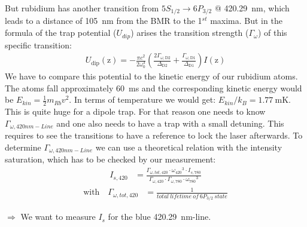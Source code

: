 But rubidium has another transition from \(5S_{1/2} \rightarrow 6P_{3/2}\) @
\SI{420.29}{\nano\meter}, which leads to a distance of \SI{105}{\nano\meter} from
the BMR to the 1\(^{st}\) maxima. But in the formula \citep{grimm} of the trap potential (\(U_{dip}\))
arises the transition strength (\(\Gamma_\omega \)) of this specific transition:
\bigskip
\begin{align}
    U_\mathrm{dip}(\mathrm{z})=-\frac{\pi c^2}{2\omega_0^3} \left( \frac{2\Gamma_{\omega,\mathrm{D2}}}{\Delta_{\mathrm{D2}}} + \frac{\Gamma_{\omega,\mathrm{D1}}}{\Delta_{\mathrm{D1}}}\right) I(\mathrm{z})
\end{align}
\bigskip
We have to compare this potential to the kinetic energy of our rubidium atoms. The atoms fall approximately
\SI{60}{\milli\second} and the corresponding kinetic energy would be \(E_{kin} = \frac{1}{2} m_{Rb} v^2\).
In terms of temperature we would get: \(E_{kin} / k_B = \SI{1.77}{\milli\kelvin} \). This is quite huge
for a dipole trap. For that reason one needs to know \(\Gamma_{\omega,420nm-Line} \) and one also needs to have a trap
with a small detuning. This requires to see the transitions to have a reference to lock the laser afterwards.
\bigskip
To determine \(\Gamma_{\omega,420nm-Line} \) we can use a theoretical relation with the intensity saturation, which has to be checked by our measurement:
\begin{align}
    I_{s,420} &= \frac{\Gamma_{\omega,tot,420}\cdot{\omega_{420}}^3\cdot I_{s,780}}{\Gamma_{\omega,420}\cdot\Gamma_{\omega,780}\cdot{\omega_{780}}^3}
\end{align}
\begin{align*}
    \text{with~~~} \Gamma_{\omega,tot,420} &= \frac{1}{total~lifetime~of~6P_{3/2}~state}
\end{align*}
\medskip


\(\Rightarrow \) We want to measure \(I_{s}\) for the blue \SI{420.29}{\nano\meter}-line. 

